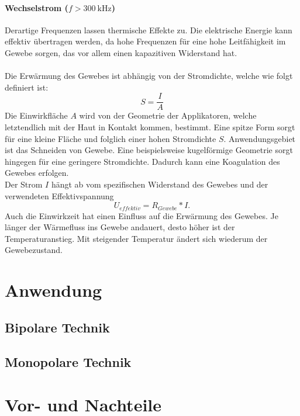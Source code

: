 \documentclass[letterpaper,12pt]{article}
\begin{document}
			\paragraph{Wechselstrom ($f>\SI{300}{\kilo\hertz}$)}
			Derartige Frequenzen lassen thermische Effekte zu. Die elektrische Energie kann effektiv übertragen werden, da hohe Frequenzen für eine hohe Leitfähigkeit im Gewebe sorgen, das vor allem einen kapazitiven Widerstand hat.\\\\	
			Die Erwärmung des Gewebes ist abhängig von der Stromdichte, welche wie folgt definiert ist:
			\begin{equation} \label{eq:stromdichte}
				S=\frac{I}{A}
			\end{equation}
			Die Einwirkfläche $A$ wird von der Geometrie der Applikatoren, welche letztendlich mit der Haut in Kontakt kommen, bestimmt. Eine spitze Form sorgt für eine kleine Fläche und folglich einer hohen Stromdichte $S$. Anwendungsgebiet ist das Schneiden von Gewebe. Eine beispielsweise kugelförmige Geometrie sorgt hingegen für eine geringere Stromdichte. Dadurch kann eine Koagulation des Gewebes erfolgen.\\Der Strom $I$ hängt ab vom spezifischen Widerstand des Gewebes und der verwendeten Effektivspannung
			\begin{equation} \label{eq:effektivspannung}
			U_{effektiv}=R_{Gewebe}*I.
			\end{equation}
			Auch die Einwirkzeit hat einen Einfluss auf die Erwärmung des Gewebes. Je länger der Wärmefluss ins Gewebe andauert, desto höher ist der Temperaturanstieg. Mit steigender Temperatur ändert sich wiederum der Gewebezustand.
		
		
	\section{Anwendung}
	
		\subsection{Bipolare Technik}
		
		\subsection{Monopolare Technik}
	
	
	\section{Vor- und Nachteile}
	
\end{document}
